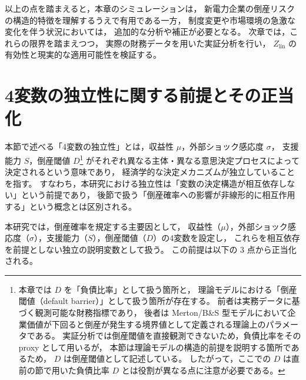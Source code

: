 以上の点を踏まえると，本章のシミュレーションは，
新電力企業の倒産リスクの構造的特徴を理解するうえで有用である一方，
制度変更や市場環境の急激な変化を伴う状況においては，
追加的な分析や補正が必要となる。
次章では，これらの限界を踏まえつつ，
実際の財務データを用いた実証分析を行い，
$Z_{\text{lin}}$ の有効性と現実的な適用可能性を検証する。


\section{4変数の独立性に関する前提とその正当化}

本節で述べる「4変数の独立性」とは，収益性 $\mu$，外部ショック感応度 $\sigma$，
支援能力 $S$，倒産閾値 $D$\footnote{
本章では $D$ を「負債比率」として扱う箇所と，
理論モデルにおける「倒産閾値（default barrier）」として扱う箇所が存在する。
前者は実務データに基づく観測可能な財務指標であり，
後者は Merton/B\&S 型モデルにおいて企業価値が下回ると倒産が発生する境界値として定義される理論上のパラメータである。
実証分析では倒産閾値を直接観測できないため，負債比率をその proxy として用いるが，
本節は理論モデルの構造的前提を説明する箇所であるため，
$D$ は倒産閾値として記述している。
したがって，ここでの $D$ は直前の節で用いた負債比率 $D$ とは役割が異なる点に注意が必要である。}
がそれぞれ異なる主体・異なる意思決定プロセスによって決定されるという意味であり，
経済学的な決定メカニズムが独立していることを指す。
すなわち，本研究における独立性は「変数の決定構造が相互依存しない」という前提であり，
後節で扱う「倒産確率への影響が非線形的に相互作用する」という概念とは区別される。

本研究では，倒産確率を規定する主要因として，
収益性（$\mu$），外部ショック感応度（$\sigma$），支援能力（$S$），倒産閾値（$D$）の4変数を設定し，
これらを相互依存を前提としない独立の説明変数として扱う。
この前提は以下の 3 点から正当化される。

